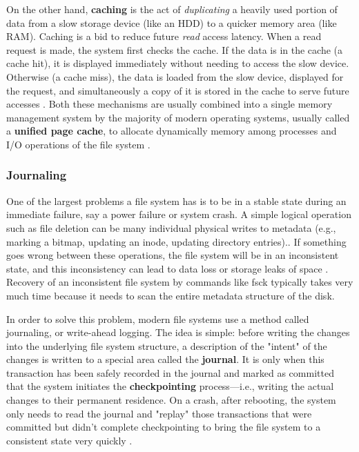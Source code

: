 \documentclass[12pt]{article}
\begin{document}
On the other hand, \textbf{caching} is the act of \textit{duplicating} a heavily used portion of data from a slow storage device (like an HDD) to a quicker memory area (like RAM). Caching is a bid to reduce future \textit{read} access latency. When a read request is made, the system first checks the cache. If the data is in the cache (a cache hit), it is displayed immediately without needing to access the slow device. Otherwise (a cache miss), the data is loaded from the slow device, displayed for the request, and simultaneously a copy of it is stored in the cache to serve future accesses \parencite{GeeksForGeeks2025BufferCache}. Both these mechanisms are usually combined into a single memory management system by the majority of modern operating systems, usually called a \textbf{unified page cache}, to allocate dynamically memory among processes and I/O operations of the file system \parencite{Silberschatz2018}.

\subsubsection{Journaling}
One of the largest problems a file system has is to be in a stable state during an immediate failure, say a power failure or system crash. A simple logical operation such as file deletion can be many individual physical writes to metadata (e.g., marking a bitmap, updating an inode, updating directory entries).. If something goes wrong between these operations, the file system will be in an inconsistent state, and this inconsistency can lead to data loss or storage leaks of space \parencite{LibreTextsJournaling}. Recovery of an inconsistent file system by commands like fsck typically takes very much time because it needs to scan the entire metadata structure of the disk.

In order to solve this problem, modern file systems use a method called journaling, or write-ahead logging. The idea is simple: before writing the changes into the underlying file system structure, a description of the "intent" of the changes is written to a special area called the \textbf{journal}. It is only when this transaction has been safely recorded in the journal and marked as committed that the system initiates the \textbf{checkpointing} process—i.e., writing the actual changes to their permanent residence. On a crash, after rebooting, the system only needs to read the journal and "replay" those transactions that were committed but didn't complete checkpointing to bring the file system to a consistent state very quickly \parencite{Prabhakaran2005journaling, Jones2008Anatomy}.
\end{document}
